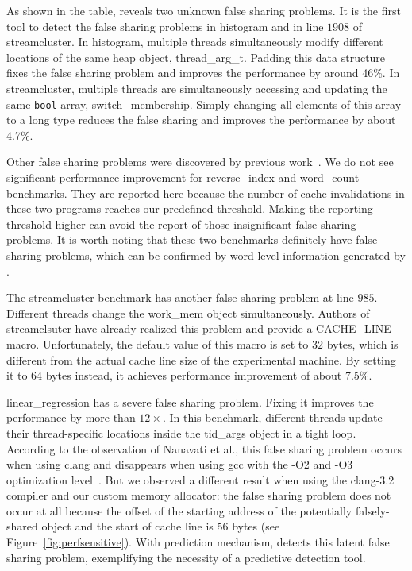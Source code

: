 As shown in the table, \Predator{} reveals two unknown false sharing problems. It is the first tool to detect the false sharing problems in histogram and in line $1908$ of streamcluster. 
In histogram, multiple threads simultaneously modify different locations of the same heap object, thread\_arg\_t. 
Padding this data structure fixes the false sharing problem and improves the performance by around 46\%. In streamcluster, multiple threads are simultaneously accessing and updating the same \texttt{bool} array, switch\_membership. Simply changing all elements of this array to a long type reduces the false sharing and improves the performance by about 4.7\%.

Other false sharing problems were discovered by previous work~\cite{sheriff}. We do not see significant performance improvement for reverse\_index and word\_count benchmarks. They are reported here because the number of cache invalidations in these two programs reaches our predefined threshold.
Making the reporting threshold higher can avoid the report of those insignificant false sharing problems.
It is worth noting that these two benchmarks definitely have false sharing problems,
which can be confirmed by word-level information generated by \Predator{}. 

The streamcluster benchmark has another false sharing problem at line $985$. Different threads change the work\_mem object simultaneously. Authors of streamclsuter have already realized this problem and provide a CACHE\_LINE macro. Unfortunately, the default value of this macro is set to $32$ bytes, which is different from the actual cache line size of the experimental machine. By setting it to $64$ bytes instead, it achieves  performance improvement of about 7.5\%.

linear\_regression has a severe false sharing problem. Fixing it improves the performance by more than $12\times$. In this benchmark, different threads update their thread-specific locations inside the tid\_args object in a tight loop. According to the observation of Nanavati et al., this false sharing problem occurs when using clang and disappears when using gcc with the -O2 and -O3 optimization level~\cite{OSdetection}. But we observed a different result when using the clang-3.2 compiler and our custom memory allocator: the false sharing problem does not occur at all because the offset of the starting address of the potentially falsely-shared object and the start of cache line is 56 bytes (see Figure~\ref{fig:perfsensitive}). With prediction mechanism, \Predator{} detects this latent false sharing problem, exemplifying the necessity of a predictive detection tool. 

